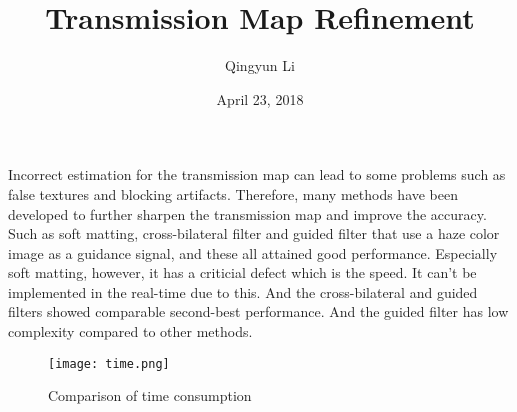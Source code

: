 \documentclass{article}
\author{Qingyun Li}
\date{April 23, 2018}
\title{Transmission Map Refinement}
\begin{document}
\maketitle
\par Incorrect estimation for the transmission map can lead to some problems such as false textures and blocking artifacts. Therefore, many methods have been developed to further sharpen the transmission map and improve the accuracy. Such as soft matting, cross-bilateral filter and guided filter that use a haze color image as a guidance signal, and these all attained good performance. Especially soft matting, however, it has a criticial defect which is the speed. It can't be implemented in the real-time due to this. And the cross-bilateral and guided filters showed comparable second-best performance. And the guided filter has low complexity compared to other methods. 
\begin{figure}[htbp]
\begin{minipage}{1\linewidth}
\centering{}
\texttt{[image: time.png]}\\
\caption{Comparison of time consumption}\label{time} 
\end{minipage} 
\end{figure}
\end{document}
